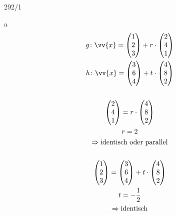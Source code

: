 \begin{exercise}{292/1}
  \item [a]
  \begin{gather*}
    g \colon \vv{x} = \begin{pmatrix}1 \\ 2 \\ 3\end{pmatrix} + r \cdot \begin{pmatrix}2 \\ 4 \\ 1\end{pmatrix} \\
    h \colon \vv{x} = \begin{pmatrix}3 \\ 6 \\ 4\end{pmatrix} + t \cdot \begin{pmatrix}4 \\ 8 \\ 2\end{pmatrix} \\\\
    \begin{pmatrix}2 \\ 4 \\ 1\end{pmatrix} = r \cdot \begin{pmatrix}4 \\ 8 \\ 2\end{pmatrix} \\
    r = 2 \\
    \Rightarrow \text{identisch oder parallel} \\\\
    \begin{pmatrix}1 \\ 2 \\ 3\end{pmatrix} = \begin{pmatrix}3 \\ 6 \\ 4\end{pmatrix} + t \cdot \begin{pmatrix}4 \\ 8 \\ 2\end{pmatrix} \\
    t = -\frac{1}{2} \\
    \Rightarrow \text{identisch}
  \end{gather*}
\end{exercise}
